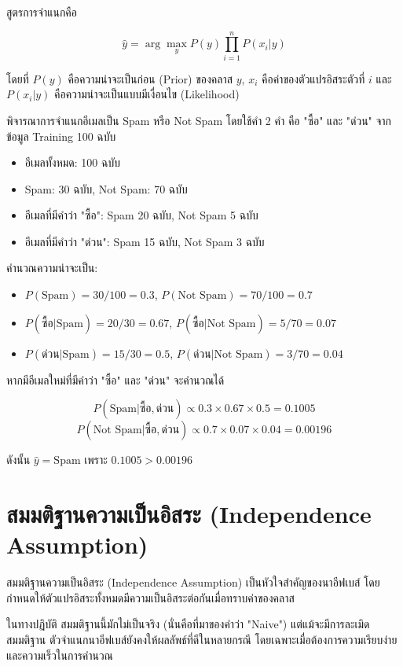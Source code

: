 สูตรการจำแนกคือ

\[
\hat{y} = \arg\max_{y} P(y) \prod_{i=1}^{n} P(x_i | y)
\]

โดยที่ $P(y)$ คือความน่าจะเป็นก่อน (Prior) ของคลาส $y$, $x_i$ คือค่าของตัวแปรอิสระตัวที่ $i$ และ $P(x_i | y)$ คือความน่าจะเป็นแบบมีเงื่อนไข (Likelihood)

\begin{exmp}
\label{exmp:naive_bayes_email}
พิจารณาการจำแนกอีเมลเป็น Spam หรือ Not Spam โดยใช้คำ 2 คำ คือ "ซื้อ" และ "ด่วน" จากข้อมูล Training 100 ฉบับ

\begin{itemize}
\item อีเมลทั้งหมด: 100 ฉบับ
\item Spam: 30 ฉบับ, Not Spam: 70 ฉบับ
\item อีเมลที่มีคำว่า "ซื้อ": Spam 20 ฉบับ, Not Spam 5 ฉบับ
\item อีเมลที่มีคำว่า "ด่วน": Spam 15 ฉบับ, Not Spam 3 ฉบับ
\end{itemize}

คำนวณความน่าจะเป็น:
\begin{itemize}
\item $P(\text{Spam}) = 30/100 = 0.3$, $P(\text{Not Spam}) = 70/100 = 0.7$
\item $P(\text{ซื้อ}|\text{Spam}) = 20/30 = 0.67$, $P(\text{ซื้อ}|\text{Not Spam}) = 5/70 = 0.07$
\item $P(\text{ด่วน}|\text{Spam}) = 15/30 = 0.5$, $P(\text{ด่วน}|\text{Not Spam}) = 3/70 = 0.04$
\end{itemize}

หากมีอีเมลใหม่ที่มีคำว่า "ซื้อ" และ "ด่วน" จะคำนวณได้

\[
P(\text{Spam}|\text{ซื้อ},\text{ด่วน}) \propto 0.3 \times 0.67 \times 0.5 = 0.1005
\]
\[
P(\text{Not Spam}|\text{ซื้อ},\text{ด่วน}) \propto 0.7 \times 0.07 \times 0.04 = 0.00196
\]

ดังนั้น $\hat{y} = \text{Spam}$ เพราะ $0.1005 > 0.00196$
\end{exmp}

\section{สมมติฐานความเป็นอิสระ (Independence Assumption)}
สมมติฐานความเป็นอิสระ (Independence Assumption) เป็นหัวใจสำคัญของนาอีฟเบส์ โดยกำหนดให้ตัวแปรอิสระทั้งหมดมีความเป็นอิสระต่อกันเมื่อทราบค่าของคลาส

ในทางปฏิบัติ สมมติฐานนี้มักไม่เป็นจริง (นั่นคือที่มาของคำว่า "Naive") แต่แม้จะมีการละเมิดสมมติฐาน ตัวจำแนกนาอีฟเบส์ยังคงให้ผลลัพธ์ที่ดีในหลายกรณี โดยเฉพาะเมื่อต้องการความเรียบง่ายและความเร็วในการคำนวณ

